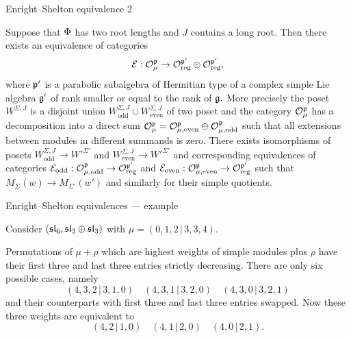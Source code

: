 \documentclass[10pt]{beamer}
\begin{document}
\begin{frame}{Enright--Shelton equivalence  2}
\begin{theorem} 
 Suppose that $\Phi$ has two root lengths and $J$ contains a long root. Then there exists an equivalence of categories
	\[
	\mathcal{E}: \mathcal{O}^{\mathfrak{p}}_\mu \to \mathcal{O}^{\mathfrak{p'}}_{\mathrm{reg}} \oplus  \mathcal{O}^{\mathfrak{p'}}_{\mathrm{reg}},
	\]
	where $\mathfrak{p}'$ is a parabolic subalgebra of Hermitian type of a complex simple Lie algebra $\mathfrak{g}'$ of rank \alert{smaller} or equal to the rank of $\mathfrak{g}.$ More precisely the poset $W^{\Sigma, J}$ is a disjoint union $W^{\Sigma, J}_\mathrm{odd} \cup W^{\Sigma, J}_{\mathrm{even}}$ of two poset and the category $\mathcal{O} ^{\mathfrak{p}}_\mu$ has a decomposition into a direct sum $\mathcal{O} ^{\mathfrak{p}}_\mu = \mathcal{O} ^{\mathfrak{p}}_{\mu, \mathrm{even}} \oplus \mathcal{O} ^{\mathfrak{p}}_{\mu, \mathrm{odd}}$ such that all extensions between modules in different summands is zero. There exists isomorphisms of posets $ W^{\Sigma, J}_{\mathrm{odd}} \to W'^{\Sigma'}$ and $ W^{\Sigma, J}_{\mathrm{even}} \to W'^{\Sigma'}$ and corresponding equivalences of categories $\mathcal{E}_{\mathrm{odd}}: \mathcal{O} ^{\mathfrak{p}}_{\mu, \mathrm{odd}} \to  \mathcal{O}^{\mathfrak{p'}}_{\mathrm{reg}}$ and $\mathcal{E}_{\mathrm{even}}: \mathcal{O} ^{\mathfrak{p}}_{\mu, \mathrm{even}} \to  \mathcal{O}^{\mathfrak{p'}}_{\mathrm{reg}}$ such that $M_\Sigma(w) \to M_{\Sigma'} (w')$ and similarly for their simple quotients.

\end{theorem}

\end{frame}

\begin{frame}{Enright--Shelton equivalences --- example}

Consider $(\mathfrak{sl}_6, \mathfrak{sl}_3 \oplus \mathfrak{sl}_3)$ with $\mu = (0,1,2\, |\, 3,3,4)$. 

Permutations of $\mu + \rho$ which are highest weights  of simple modules plus $\rho$ have their first three and last three entries strictly decreasing.  There are only six possible cases, namely
\[
(4, 3, 2\, |\, 3, 1, 0) \quad (4, 3, 1\, |\,3, 2, 0) \quad (4, 3, 0\, |\,3, 2, 1)
\]
and their counterparts with first three and last three entries swapped. Now these three weights are equivalent to 
\[
(4,  2\, |\,  1, 0) \quad (4,  1\, |\, 2, 0) \quad (4,  0\, |\, 2, 1).
\]

\end{frame}
\end{document}
